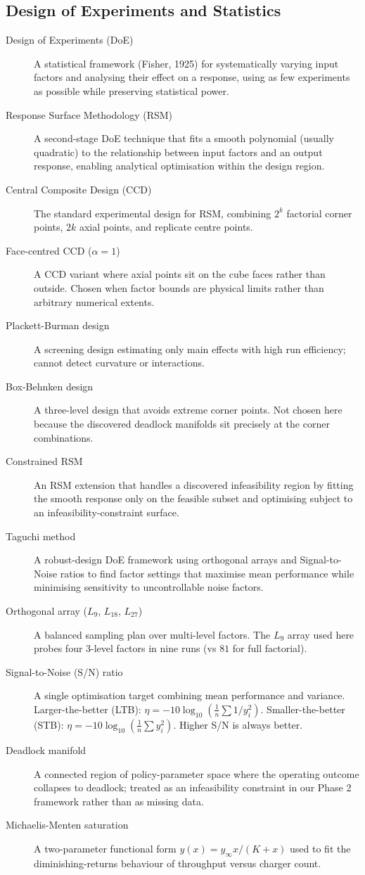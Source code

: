 \documentclass[conference]{IEEEtran}
\begin{document}
\subsection*{Design of Experiments and Statistics}
\begin{description}
  \item[Design of Experiments (DoE)] A statistical framework (Fisher, 1925) for systematically varying input factors and analysing their effect on a response, using as few experiments as possible while preserving statistical power.
  \item[Response Surface Methodology (RSM)] A second-stage DoE technique that fits a smooth polynomial (usually quadratic) to the relationship between input factors and an output response, enabling analytical optimisation within the design region.
  \item[Central Composite Design (CCD)] The standard experimental design for RSM, combining $2^k$ factorial corner points, $2k$ axial points, and replicate centre points.
  \item[Face-centred CCD ($\alpha = 1$)] A CCD variant where axial points sit on the cube faces rather than outside. Chosen when factor bounds are physical limits rather than arbitrary numerical extents.
  \item[Plackett-Burman design] A screening design estimating only main effects with high run efficiency; cannot detect curvature or interactions.
  \item[Box-Behnken design] A three-level design that avoids extreme corner points. Not chosen here because the discovered deadlock manifolds sit precisely at the corner combinations.
  \item[Constrained RSM] An RSM extension that handles a discovered infeasibility region by fitting the smooth response only on the feasible subset and optimising subject to an infeasibility-constraint surface.
  \item[Taguchi method] A robust-design DoE framework using orthogonal arrays and Signal-to-Noise ratios to find factor settings that maximise mean performance while minimising sensitivity to uncontrollable noise factors.
  \item[Orthogonal array ($L_9$, $L_{18}$, $L_{27}$)] A balanced sampling plan over multi-level factors. The $L_9$ array used here probes four 3-level factors in nine runs (vs $81$ for full factorial).
  \item[Signal-to-Noise (S/N) ratio] A single optimisation target combining mean performance and variance. Larger-the-better (LTB): $\eta = -10 \log_{10}(\tfrac{1}{n}\sum 1/y_i^2)$. Smaller-the-better (STB): $\eta = -10 \log_{10}(\tfrac{1}{n}\sum y_i^2)$. Higher S/N is always better.
  \item[Deadlock manifold] A connected region of policy-parameter space where the operating outcome collapses to deadlock; treated as an infeasibility constraint in our Phase 2 framework rather than as missing data.
  \item[Michaelis-Menten saturation] A two-parameter functional form $y(x) = y_\infty x / (K + x)$ used to fit the diminishing-returns behaviour of throughput versus charger count.
\end{description}
\end{document}
